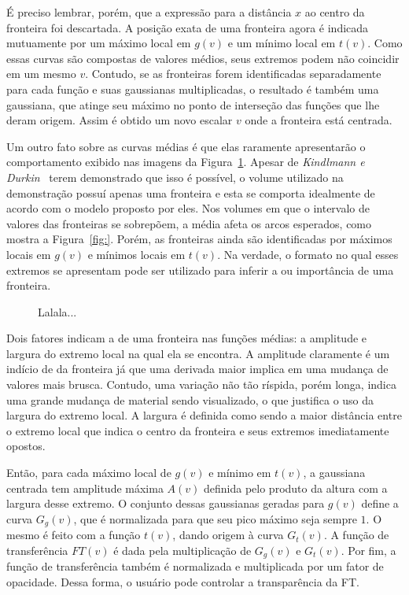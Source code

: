 	É preciso lembrar, porém, que a expressão para a distância $ x $ ao centro da fronteira foi descartada. A posição exata de uma fronteira agora é indicada mutuamente por um máximo local em $ g(v) $ e um mínimo local em $ t(v) $. Como essas curvas são compostas de valores médios, seus extremos podem não coincidir em um mesmo $ v $. Contudo, se as fronteiras forem identificadas separadamente para cada função e suas gaussianas multiplicadas, o resultado é também uma gaussiana, que atinge seu máximo no ponto de interseção das funções que lhe deram origem. Assim é obtido um novo escalar $ v $ onde a fronteira está centrada.

	Um outro fato sobre as curvas médias é que elas raramente apresentarão o comportamento exibido nas imagens da Figura~\ref{fig:m_gauss}. Apesar de \textit{Kindlmann e Durkin}~\cite{gordon} terem demonstrado que isso é possível, o volume utilizado na demonstração possuí apenas uma fronteira e esta se comporta idealmente de acordo com o modelo proposto por eles. Nos volumes em que o intervalo de valores das fronteiras se sobrepõem, a média afeta os arcos esperados, como mostra a Figura~\ref{fig:}. Porém, as fronteiras ainda são identificadas por máximos locais em $ g(v) $ e mínimos locais em $ t(v) $. Na verdade, o formato no qual esses extremos se apresentam pode ser utilizado para inferir a  ou importância de uma fronteira.
	
\begin{figure}[h]
	\centering
	\subfigure[]
	{
		\label{fig:m_gauss_ft}
	}
	\subfigure[]
	{
		\label{fig:m_gausses_ft}
	}
	\label{fig:m_gauss}
	\caption{Lalala...}
\end{figure}
	
	Dois fatores indicam a  de uma fronteira nas funções médias: a amplitude e largura do extremo local na qual ela se encontra. A amplitude claramente é um indício de  da fronteira já que uma derivada maior implica em uma mudança de valores mais brusca. Contudo, uma variação não tão ríspida, porém longa, indica uma grande mudança de material sendo visualizado, o que justifica o uso da largura do extremo local. A largura é definida como sendo a maior distância entre o extremo local que indica o centro da fronteira e seus extremos imediatamente opostos.
	
	Então, para cada máximo local de $ g(v) $ e mínimo em $ t(v) $, a gaussiana centrada tem amplitude máxima $ A(v) $ definida pelo produto da altura com a largura desse extremo. O conjunto dessas gaussianas geradas para $ g(v) $ define a curva $ G_{g}(v) $, que é normalizada para que seu pico máximo seja sempre $ 1 $. O mesmo é feito com a função $ t(v) $, dando origem à curva $ G_{t}(v) $. A função de transferência $ FT(v) $ é dada pela multiplicação de $ G_{g}(v) $ e $ G_{t}(v) $. Por fim, a função de transferência também é normalizada e multiplicada por um fator de opacidade. Dessa forma, o usuário pode controlar a transparência da FT.
	
